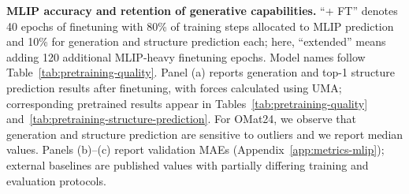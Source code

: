 \documentclass{article} %
\begin{document}
\begin{table}[!t]
  \centering
  \scriptsize
  \renewcommand{\arraystretch}{0.95}
  \caption{\textbf{MLIP accuracy and retention of generative capabilities.} ``+ FT'' denotes 40 epochs of finetuning with 80\% of training steps allocated to MLIP prediction and 10\% for generation and structure prediction each; here, ``extended'' means adding 120 additional MLIP-heavy finetuning epochs. Model names follow Table~\ref{tab:pretraining-quality}. Panel (a) reports generation and top-1 structure prediction results after finetuning, with forces calculated using UMA; corresponding pretrained results appear in Tables~\ref{tab:pretraining-quality} and~\ref{tab:pretraining-structure-prediction}. For OMat24, we observe that generation and structure prediction are sensitive to outliers and we report median values. Panels (b)--(c) report validation MAEs (Appendix~\ref{app:metrics-mlip}); external baselines are published values with partially differing training and evaluation protocols.}
  \label{tab:mlip-finetuning}
  \vspace{0.4em}


\end{table}
\end{document}

